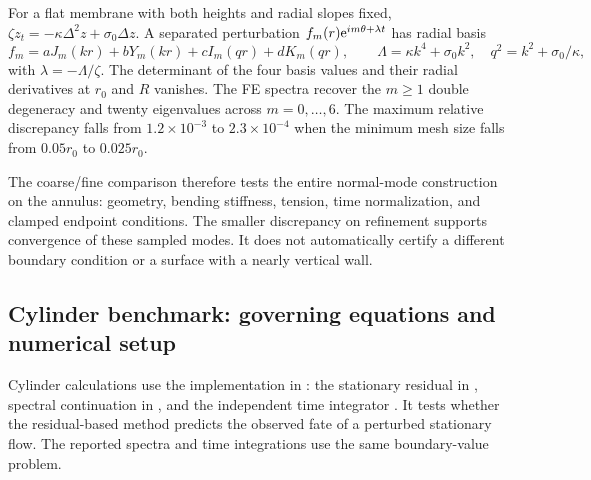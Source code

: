 For a flat membrane with both heights and radial slopes fixed, $\zeta z_t=-\kappa\Delta^2z+\sigma_0\Delta z$. A separated perturbation $f_m(r)\mathrm{e}^{im\theta+\lambda t}$ has radial basis
\begin{equation}
f_m=aJ_m(kr)+bY_m(kr)+cI_m(qr)+dK_m(qr),\qquad
\Lambda=\kappa k^4+\sigma_0k^2,
\quad q^2=k^2+\sigma_0/\kappa,
\end{equation}
with $\lambda=-\Lambda/\zeta$. The determinant of the four basis values and their radial derivatives at $r_0$ and $R$ vanishes. The FE spectra recover the $m\geq1$ double degeneracy and twenty eigenvalues across $m=0,\ldots,6$. The maximum relative discrepancy falls from $1.2\times10^{-3}$ to $2.3\times10^{-4}$ when the minimum mesh size falls from $0.05r_0$ to $0.025r_0$.


The coarse/fine comparison therefore tests the entire normal-mode construction on the annulus: geometry, bending stiffness, tension, time normalization, and clamped endpoint conditions. The smaller discrepancy on refinement supports convergence of these sampled modes. It does not automatically certify a different boundary condition or a surface with a nearly vertical wall.






\subsection{Cylinder benchmark: governing equations and numerical setup}
\label{sec:cylinder-confirmation}
Cylinder calculations use the implementation in : the stationary residual in , spectral continuation in , and the independent time integrator . It tests whether the residual-based method predicts the observed fate of a perturbed stationary flow. The reported spectra and time integrations use the same boundary-value problem.

